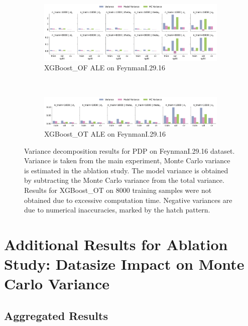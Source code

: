 \documentclass[runningheads]{llncs}
\begin{document}
\begin{figure}[htbp]
    \centering
    \begin{subfigure}[b]{0.9\textwidth}
        \includegraphics[width=\textwidth]{img/FeynmanI.29.16-all/variance_decomposition_ale_XGBoost_OF.png}
        \caption{XGBoost\_OF ALE on FeynmanI.29.16}
    \end{subfigure}
    \\[10pt]
    \vfill
    \begin{subfigure}[b]{0.9\textwidth}
        \includegraphics[width=\textwidth]{img/FeynmanI.29.16-all/variance_decomposition_ale_XGBoost_OT.png}
        \caption{XGBoost\_OT ALE on FeynmanI.29.16}
    \end{subfigure}
    \caption{Variance decomposition results for PDP on FeynmanI.29.16 dataset. Variance is taken from the
    main experiment, Monte Carlo variance is estimated in the ablation study. The model variance is
    obtained by subtracting the Monte Carlo variance from the total variance. Results for XGBoost\_OT
    on 8000 training samples were not obtained due to excessive computation time. Negative variances are
    due to numerical inaccuracies, marked by the hatch pattern.}
    \label{fig:ale-variance-decomp-feynman}  %
\end{figure}


\clearpage
\section{Additional Results for Ablation Study: Datasize Impact on Monte Carlo Variance}\label{app:additional-mc-results}

\subsection{Aggregated Results}
\end{document}
